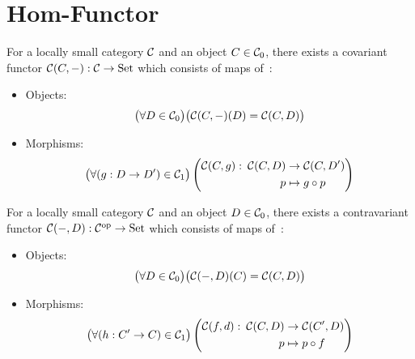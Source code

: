 \section{Hom-Functor}

\begin{definition}
  For a locally small category $\mathcal{C}$ and an object $C\in \mathcal{C}_0$, there exists a
  covariant functor $\mathcal{C}(C, {\--}) : \mathcal{C} \to \mathrm{Set}$ which consists of maps
  of~\parencite[p.~84]{leinster:basic_category_theory}:
  \begin{itemize}
    \item Objects:
      \[\big(\forall D \in \mathcal{C}_0\big)
        \big(\mathcal{C}(C, {\--})(D) = \mathcal{C}(C, D)\big)\]
    \item Morphisms:
      \[
        \begin{gathered}
          \big(\forall (g: D\to D')\in \mathcal{C}_1\big)
          \left(
            \begin{aligned}
              \mathcal{C}(C, g):&&\!\!\! \mathcal{C}(C, D) &\to \mathcal{C}(C, D')\\
              &&p &\mapsto g\circ p
            \end{aligned}
          \right)
        \end{gathered}
      \]
  \end{itemize}
\end{definition}

\begin{definition}
  For a locally small category $\mathcal{C}$ and an object $D\in \mathcal{C}_0$, there exists a
  contravariant functor $\mathcal{C}({\--}, D) : \mathcal{C}^{\mathrm{op}} \to \mathrm{Set}$ which consists
  of maps of~\parencite[p.~90]{leinster:basic_category_theory}:
  \begin{itemize}
    \item Objects:
      \[\big(\forall D \in \mathcal{C}_0\big)
        \big(\mathcal{C}({\--}, D)(C) = \mathcal{C}(C, D)\big)\]
    \item Morphisms:
      \[
        \begin{gathered}
          \big(\forall (h: C'\to C)\in \mathcal{C}_1\big)
          \left(
            \begin{aligned}
              \mathcal{C}(f, d):&&\!\!\! \mathcal{C}(C, D) &\to \mathcal{C}(C', D)\\
              &&p &\mapsto p\circ f
            \end{aligned}
          \right)
        \end{gathered}
      \]
  \end{itemize}
\end{definition}


